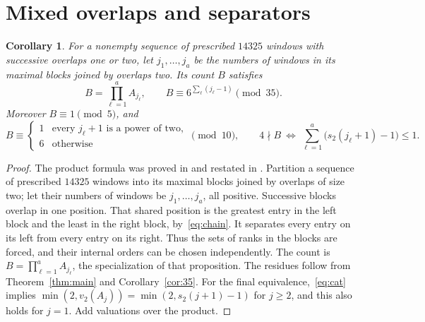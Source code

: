 \documentclass[11pt]{article}
\newtheorem{corollary}[theorem]{Corollary}
\begin{document}
\section{Mixed overlaps and separators}
\begin{corollary}\label{cor:mixed}
For a nonempty sequence of prescribed $14325$ windows with successive
overlaps one or two, let $j_1,\ldots,j_a$ be the numbers of windows
in its maximal blocks joined by overlaps two. Its count $B$ satisfies
\[
 B=\prod_{\ell=1}^a A_{j_\ell},\qquad
 B\equiv6^{\sum_\ell(j_\ell-1)}\pmod{35}.
\]
Moreover $B\equiv1\pmod5$, and
\[
 B\equiv\begin{cases}
 1&\text{every }j_\ell+1\text{ is a power of two},\\
 6&\text{otherwise}
 \end{cases}\pmod {10},\qquad
 4\nmid B\ \Longleftrightarrow\
 \sum_{\ell=1}^a\bigl(s_2(j_\ell+1)-1\bigr)\leq1.
\]
\end{corollary}
\begin{proof}
The product formula was proved in \cite[Proposition~5, p.~9]{BKS23}
and restated in \cite[Proposition~6.1]{BKS}. Partition a sequence of prescribed
$14325$ windows into its maximal blocks joined by overlaps of size two;
let their numbers of windows be $j_1,\ldots,j_a$, all positive.
Successive blocks overlap in one position. That shared position is
the greatest entry in the left block and the least in the right block,
by~\eqref{eq:chain}. It separates every entry on its left from every
entry on its right. Thus the sets of ranks in the blocks are forced,
and their internal orders can be chosen independently. The count is
$B=\prod_{\ell=1}^a A_{j_\ell}$, the specialization of that proposition.
The residues follow from Theorem~\ref{thm:main} and
Corollary~\ref{cor:35}. For the final equivalence,~\eqref{eq:cat} implies
$\min(2,v_2(A_j))=\min(2,s_2(j+1)-1)$ for $j\geq2$,
and this also holds for $j=1$. Add valuations over the product.
\end{proof}
\end{document}

